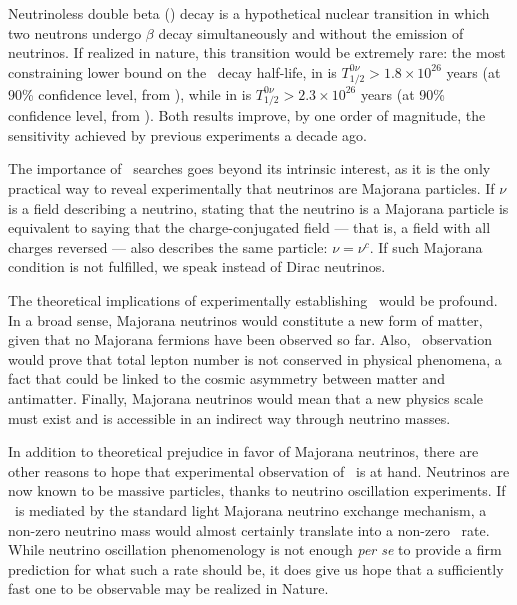 Neutrinoless double beta (\bbonu) decay  is a hypothetical nuclear transition in which two neutrons undergo $\beta$ decay simultaneously and without the emission of neutrinos. If realized in nature, this transition would be extremely rare: the most constraining lower bound on the \bbonu\ decay half-life, in  is \mbox{$T^{0\nu}_{1/2} > 1.8 \times 10^{26}$} years (at 90\% confidence level, from \cite{GERDA:2020xhi}), while in  is \mbox{$T^{0\nu}_{1/2} > 2.3 \times 10^{26}$} years (at 90\% confidence level, from \cite{KamLAND-Zen:2022tow}). Both results improve, by one order of magnitude, the sensitivity achieved by previous experiments a decade ago. 

The importance of \bbonu\ searches goes beyond its intrinsic interest, as it is the only practical way to reveal experimentally that neutrinos are Majorana particles. If $\nu$ is a field describing a neutrino, stating that the neutrino is a Majorana particle is equivalent to saying that the charge-conjugated field --- that is, a field with all charges reversed --- also describes the same particle: $\nu=\nu^c$. If such Majorana condition is not fulfilled, we speak instead of Dirac neutrinos. 

The theoretical implications of experimentally establishing \bbonu\ would be profound. In a broad sense, Majorana neutrinos would constitute a new form of matter, given that no Majorana fermions have been observed so far. Also, \bbonu\ observation would prove that total lepton number is not conserved in physical phenomena, a fact that could be linked to the cosmic asymmetry between matter and antimatter.  Finally, Majorana neutrinos would mean that a new physics scale must exist and is accessible in an indirect way through neutrino masses. 

In addition to theoretical prejudice in favor of Majorana neutrinos, there are other reasons to hope that experimental observation of \bbonu\ is at hand. Neutrinos are now known to be massive particles, thanks to neutrino oscillation experiments. If \bbonu\ is mediated by the standard light Majorana neutrino exchange mechanism, a non-zero neutrino mass would almost certainly translate into a non-zero \bbonu\ rate. While neutrino oscillation phenomenology is not enough \emph{per se} to provide a firm prediction for what such a rate should be, it does give us hope that a sufficiently fast one to be observable may be realized in Nature. 

